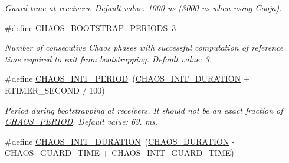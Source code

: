 \begin{DoxyCompactItemize}
\begin{DoxyCompactList}\small\item\em Guard-\/time at receivers. Default value\-: 1000 us (3000 us when using Cooja). \end{DoxyCompactList}\item 
\hypertarget{group__chaos-test-settings_ga115f8d5d589cf7d28c1a67902105c766}{\#define \hyperlink{group__chaos-test-settings_ga115f8d5d589cf7d28c1a67902105c766}{C\-H\-A\-O\-S\-\_\-\-B\-O\-O\-T\-S\-T\-R\-A\-P\-\_\-\-P\-E\-R\-I\-O\-D\-S}~3}\label{group__chaos-test-settings_ga115f8d5d589cf7d28c1a67902105c766}

\begin{DoxyCompactList}\small\item\em Number of consecutive Chaos phases with successful computation of reference time required to exit from bootstrapping. Default value\-: 3. \end{DoxyCompactList}\item 
\hypertarget{group__chaos-test-settings_ga4d273518d37ce068cf9a0a99a80f3d6b}{\#define \hyperlink{group__chaos-test-settings_ga4d273518d37ce068cf9a0a99a80f3d6b}{C\-H\-A\-O\-S\-\_\-\-I\-N\-I\-T\-\_\-\-P\-E\-R\-I\-O\-D}~(\hyperlink{group__chaos-test-settings_ga9029d010ebd88a3f038aa1a496da1e0a}{C\-H\-A\-O\-S\-\_\-\-I\-N\-I\-T\-\_\-\-D\-U\-R\-A\-T\-I\-O\-N} + R\-T\-I\-M\-E\-R\-\_\-\-S\-E\-C\-O\-N\-D / 100)}\label{group__chaos-test-settings_ga4d273518d37ce068cf9a0a99a80f3d6b}

\begin{DoxyCompactList}\small\item\em Period during bootstrapping at receivers. It should not be an exact fraction of \hyperlink{group__chaos-test-settings_ga9eb9256366e6e80d689339627c9b016a}{C\-H\-A\-O\-S\-\_\-\-P\-E\-R\-I\-O\-D}. Default value\-: 69. ms. \end{DoxyCompactList}\item 
\hypertarget{group__chaos-test-settings_ga9029d010ebd88a3f038aa1a496da1e0a}{\#define \hyperlink{group__chaos-test-settings_ga9029d010ebd88a3f038aa1a496da1e0a}{C\-H\-A\-O\-S\-\_\-\-I\-N\-I\-T\-\_\-\-D\-U\-R\-A\-T\-I\-O\-N}~(\hyperlink{group__chaos-test-settings_ga41b1c21c8fdb8d06878a6da529bd0da7}{C\-H\-A\-O\-S\-\_\-\-D\-U\-R\-A\-T\-I\-O\-N} -\/ \hyperlink{group__chaos-test-settings_gaeff8523b0c9347628bd55d607da5460d}{C\-H\-A\-O\-S\-\_\-\-G\-U\-A\-R\-D\-\_\-\-T\-I\-M\-E} + \hyperlink{group__chaos-test-settings_ga1f0aaac6ffeb7477d0718d1cfacdf4a1}{C\-H\-A\-O\-S\-\_\-\-I\-N\-I\-T\-\_\-\-G\-U\-A\-R\-D\-\_\-\-T\-I\-M\-E})}\label{group__chaos-test-settings_ga9029d010ebd88a3f038aa1a496da1e0a}


\end{DoxyCompactItemize}
